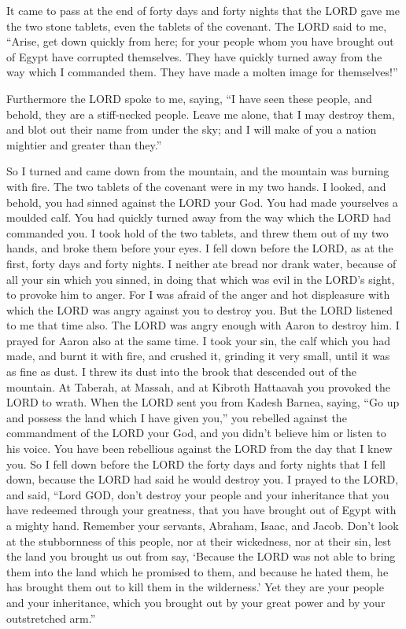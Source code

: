  It came to pass at the end of forty days and forty nights
that the LORD gave me the two stone tablets, even the tablets of the
covenant.  The LORD said to me, ``Arise, get down quickly
from here; for your people whom you have brought out of Egypt have
corrupted themselves. They have quickly turned away from the way which I
commanded them. They have made a molten image for themselves!''

 Furthermore the LORD spoke to me, saying, ``I have seen
these people, and behold, they are a stiff-necked people. 
Leave me alone, that I may destroy them, and blot out their name from
under the sky; and I will make of you a nation mightier and greater than
they.''

 So I turned and came down from the mountain, and the
mountain was burning with fire. The two tablets of the covenant were in
my two hands.  I looked, and behold, you had sinned against
the LORD your God. You had made yourselves a moulded calf. You had
quickly turned away from the way which the LORD had commanded you.
 I took hold of the two tablets, and threw them out of my
two hands, and broke them before your eyes.  I fell down
before the LORD, as at the first, forty days and forty nights. I neither
ate bread nor drank water, because of all your sin which you sinned, in
doing that which was evil in the LORD's sight, to provoke him to anger.
 For I was afraid of the anger and hot displeasure with
which the LORD was angry against you to destroy you. But the LORD
listened to me that time also.  The LORD was angry enough
with Aaron to destroy him. I prayed for Aaron also at the same time.
 I took your sin, the calf which you had made, and burnt it
with fire, and crushed it, grinding it very small, until it was as fine
as dust. I threw its dust into the brook that descended out of the
mountain.  At Taberah, at Massah, and at Kibroth Hattaavah
you provoked the LORD to wrath.  When the LORD sent you
from Kadesh Barnea, saying, ``Go up and possess the land which I have
given you,'' you rebelled against the commandment of the LORD your God,
and you didn't believe him or listen to his voice.  You
have been rebellious against the LORD from the day that I knew you.
 So I fell down before the LORD the forty days and forty
nights that I fell down, because the LORD had said he would destroy you.
 I prayed to the LORD, and said, ``Lord GOD, don't destroy
your people and your inheritance that you have redeemed through your
greatness, that you have brought out of Egypt with a mighty hand.
 Remember your servants, Abraham, Isaac, and Jacob. Don't
look at the stubbornness of this people, nor at their wickedness, nor at
their sin,  lest the land you brought us out from say,
`Because the LORD was not able to bring them into the land which he
promised to them, and because he hated them, he has brought them out to
kill them in the wilderness.'  Yet they are your people and
your inheritance, which you brought out by your great power and by your
outstretched arm.''

